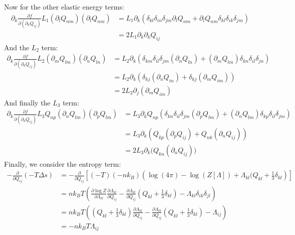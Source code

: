\documentclass[reqno]{article}
\begin{document}
	Now for the other elastic energy terms:
	\begin{equation}
	\begin{split}
		\partial_k \frac{\partial f}{\partial (\partial_k Q_{ij})} L_1 (\partial_l Q_{nm})(\partial_l Q_{nm})
		&= L_1 \partial_k \left( \delta_{kl} \delta_{in} \delta_{jm} \partial_l Q_{nm}
		+ \partial_l Q_{nm} \delta_{kl} \delta_{ik} \delta_{jm} \right) \\
		&= 2 L_1 \partial_k \partial_k Q_{ij}
	\end{split}
	\end{equation}
	And the $L_2$ term:
	\begin{equation}
	\begin{split}
		\partial_k \frac{\partial f}{\partial (\partial_k Q_{ij})} L_2 (\partial_m Q_{lm}) (\partial_n Q_{ln})
		&= L_2 \partial_k \left( \delta_{km} \delta_{il} \delta_{jm} (\partial_n Q_{ln})
		+ (\partial_m Q_{lm}) \delta_{kn} \delta_{il} \delta_{jn} \right) \\
		&= L_2 \partial_k \left( \delta_{kj} (\partial_n Q_{in}) + \delta_{kj} (\partial_m Q_{im}) \right) \\
		&= 2 L_2 \partial_j (\partial_m Q_{im})
	\end{split}
	\end{equation}
	And finally the $L_3$ term:
	\begin{equation}
	\begin{split}
		\partial_k \frac{\partial f}{\partial (\partial_k Q_{ij})} L_3 Q_{np} (\partial_n Q_{lm}) (\partial_p Q_{lm}) 
		&= L_3 \partial_k Q_{np} \left( \delta_{kn} \delta_{il} \delta_{jm} (\partial_p Q_{lm})
		+ (\partial_n Q_{lm}) \delta_{kp} \delta_{il} \delta_{jm} \right) \\
		&= L_3 \partial_k \left( Q_{kp} (\partial_p Q_{ij}) + Q_{nk} (\partial_n Q_{ij}) \right) \\
		&= 2 L_3 \partial_k \bigl( Q_{kn} (\partial_n Q_{ij}) \bigr)
	\end{split}
	\end{equation}
	Finally, we consider the entropy term:
	\begin{equation}
	\begin{split}
		- \frac{\partial}{\partial Q_{ij}} (-T \Delta s)
		&=
		- \frac{\partial}{\partial Q_{ij}} \left[(-T) (-n k_B) \left(
		\log(4 \pi) - \log( Z[\Lambda] ) + \Lambda_{kl} (Q_{kl} + \tfrac13 \delta_{kl} \right) \right] \\
		&= n k_B T \left(\frac{\partial \log Z}{\partial \Lambda_{kl}} \frac{\partial \Lambda_{kl}}{\partial Q_{ij}}
		- \frac{\partial \Lambda_{kl}}{\partial Q_{ij}} \left( Q_{kl} + \tfrac13 \delta_{kl}\right)
		- \Lambda_{kl} \delta_{ik} \delta_{jl} \right) \\
		&= n k_B T \left( \left( Q_{kl} + \tfrac13 \delta_{kl} \right) \frac{\partial \Lambda_{kl}}{\partial Q_{ij}} 
		- \frac{\partial \Lambda_{kl}}{\partial Q_{ij}} \left( Q_{kl} + \tfrac13 \delta_{kl}\right)
		- \Lambda_{ij} \right) \\
		&= -n k_B T \Lambda_{ij}
	\end{split}
	\end{equation}
\end{document}
